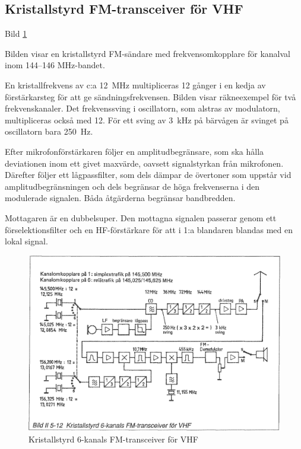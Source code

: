 \subsection{Kristallstyrd FM-transceiver för VHF}

Bild \ref{fig:bildII5-12}

Bilden visar en kristallstyrd FM-sändare med frekvensomkopplare för
kanalval inom 144--146 MHz-bandet.

En kristallfrekvens av c:a 12~MHz multipliceras 12 gånger i en kedja
av förstärkarsteg för att ge sändningsfrekvensen. Bilden visar
räkneexempel för två frekvenskanaler. Det frekvenssving i oscillatorn,
som alstras av modulatorn, multipliceras också med 12.  För ett sving
av 3~kHz på bärvågen är svinget på oscillatorn bara 250~Hz.

Efter mikrofonförstärkaren följer en amplitudbegränsare, som ska
hålla deviationen inom ett givet maxvärde, oavsett signalstyrkan från
mikrofonen. Därefter följer ett lågpassfilter, som dels dämpar de
övertoner som uppstår vid amplitudbegränsningen och dels begränsar de
höga frekvenserna i den modulerade signalen. Båda åtgärderna begränsar
bandbredden.

Mottagaren är en dubbelsuper. Den mottagna signalen passerar genom ett
förselektionsfilter och en HF-förstärkare för att i 1:a blandaren
blandas med en lokal signal.

\begin{figure}
  \includegraphics[width=\textwidth]{images/bild_2_5-12}
  \caption{Kristallstyrd 6-kanals FM-transceiver för VHF}
  \label{fig:bildII5-12}
\end{figure}

